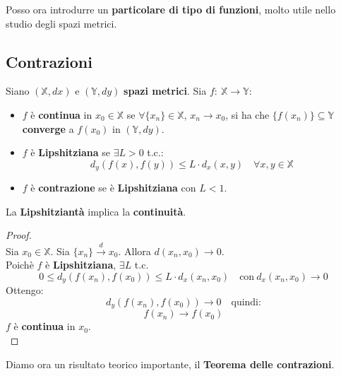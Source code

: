 \documentclass[a4paper, oneside]{article}
\newcommand\X{\mathbb{X}}
\newcommand\Y{\mathbb{Y}}
\begin{document}
\noindent Posso ora introdurre un \textbf{particolare di tipo di funzioni}, molto utile nello studio degli spazi metrici. 

\subsection{Contrazioni}
Siano $(\X,dx)$ e $(\Y,dy)$ \textbf{spazi metrici}. Sia $f: \ \X\to\Y$:
\begin{itemize}
    \item $f$ è \textbf{continua} in $x_0\in\X$ se $\forall \{x_n\}\in\X$, $x_n\to x_0$, si ha che $\{f(x_n)\}\subseteq\Y$
    \textbf{converge} a $f(x_0)$ in $(\Y,dy)$.
    \item $f$ è \textbf{Lipshitziana} se $\exists L>0$ t.c.:
    \[d_y\left(f(x),f(y)\right) \leq L\cdot d_x(x,y) \quad \forall x,y\in\X\]
    \item $f$ è \textbf{contrazione} se è \textbf{Lipshitziana} con $L< 1$.
\end{itemize}

\begin{proposition}
    La \textbf{Lipshitziantà} implica la \textbf{continuità}.

    \begin{proof}\hfill\\
        Sia $x_0\in\X$. Sia $\{x_n\}\overset{d}{\longrightarrow}x_0$. Allora $d(x_n,x_0)\to0$.\\
        Poichè $f$ è \textbf{Lipshitziana}, $\exists L$ t.c.
        \[0\leq d_y\left(f(x_n),f(x_0)\right) \leq L\cdot d_x(x_n,x_0) \quad\text{con} \ d_x(x_n,x_0)\to0\]
        Ottengo:
        \[d_y\left(f(x_n),f(x_0)\right)\to 0\quad \text{quindi:}\]
        \[f(x_n)\to f(x_0)\]
        $f$ è \textbf{continua} in $x_0$.\\
    \end{proof}
\end{proposition}

Diamo ora un risultato teorico importante, il \textbf{Teorema delle contrazioni}.
\end{document}
